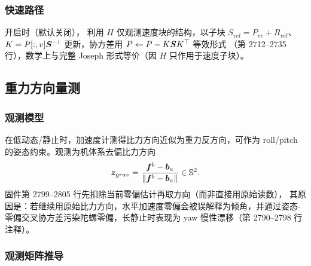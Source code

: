\subsubsection{快速路径}

 开启时（默认关闭），
利用 $H$ 仅观测速度块的结构，以子块 $S_{vel} = P_{vv} + R_{vel}$、
$K = P[:,v]\boldsymbol{S}^{-1}$ 更新，协方差用 $P \leftarrow P - K\boldsymbol{S}K^{\top}$ 等效形式
（第 2712--2735 行），数学上与完整 Joseph 形式等价（因 $H$ 只作用于速度子块）。

\subsection{重力方向量测}

\subsubsection{观测模型}

在低动态/静止时，加速度计测得比力方向近似为重力反方向，可作为
roll/pitch 的姿态约束。观测为机体系去偏比力方向
\begin{equation}
  \boldsymbol{z}_{grav} = \frac{\boldsymbol{f}^b - \boldsymbol{b}_a}{\|\boldsymbol{f}^b - \boldsymbol{b}_a\|}
  \in \mathbb{S}^2.
  \label{eq:z-gravity}
\end{equation}
固件第 2799--2805 行先扣除当前零偏估计再取方向（而非直接用原始读数），
其原因是：若继续用原始比力方向，水平加速度零偏会被误解释为倾角，并通过姿态-
零偏交叉协方差污染陀螺零偏，长静止时表现为 yaw 慢性漂移（第 2790--2798 行注释）。

\subsubsection{观测矩阵推导}

